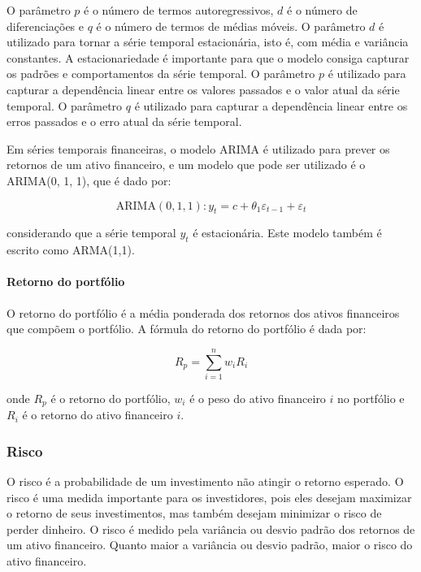                 \ipar O parâmetro $p$ é o número de termos autoregressivos, $d$ é o número de diferenciações e $q$ é o número de termos de médias móveis. O parâmetro $d$ é utilizado para tornar a série temporal estacionária, isto é, com média e variância constantes. A estacionariedade é importante para que o modelo consiga capturar os padrões e comportamentos da série temporal. O parâmetro $p$ é utilizado para capturar a dependência linear entre os valores passados e o valor atual da série temporal. O parâmetro $q$ é utilizado para capturar a dependência linear entre os erros passados e o erro atual da série temporal.

                \ipar Em séries temporais financeiras, o modelo ARIMA é utilizado para prever os retornos de um ativo financeiro, e um modelo que pode ser utilizado é o ARIMA(0, 1, 1), que é dado por:

                \begin{equation}
                    \text{ARIMA}(0, 1, 1) : y_t = c + \theta_1 \varepsilon_{t-1} + \varepsilon_t
                \end{equation}

                \noindent considerando que a série temporal $y_t$ é estacionária. Este modelo também é escrito como ARMA(1,1).

            \paragraph{Retorno do portfólio}

                \ipar O retorno do portfólio é a média ponderada dos retornos dos ativos financeiros que compõem o portfólio. A fórmula do retorno do portfólio é dada por:

                \begin{equation}
                    R_p = \sum_{i=1}^{n} w_i R_i
                \end{equation}

                \noindent onde $R_p$ é o retorno do portfólio, $w_i$ é o peso do ativo financeiro $i$ no portfólio e $R_i$ é o retorno do ativo financeiro $i$. 

        \subsubsection{Risco}

                \ipar O risco é a probabilidade de um investimento não atingir o retorno esperado. O risco é uma medida importante para os investidores, pois eles desejam maximizar o retorno de seus investimentos, mas também desejam minimizar o risco de perder dinheiro. O risco é medido pela variância ou desvio padrão dos retornos de um ativo financeiro. Quanto maior a variância ou desvio padrão, maior o risco do ativo financeiro.

